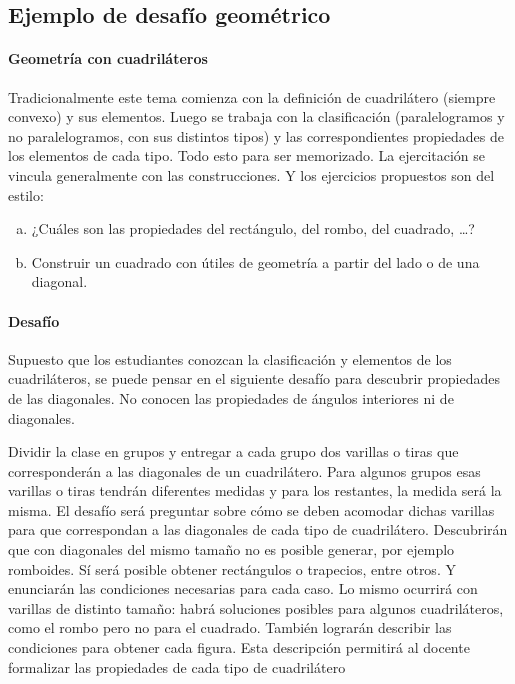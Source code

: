 \documentclass[oneside,spanish]{amsart}
\numberwithin{equation}{section}
\numberwithin{figure}{section}
\theoremstyle{definition}
\begin{document}
\subsection{Ejemplo de desafío geométrico}

\paragraph{\bfseries Geometría con cuadriláteros}

Tradicionalmente este tema comienza con la definición de cuadrilátero (siempre convexo) y sus elementos. Luego se trabaja con la clasificación (paralelogramos y no paralelogramos, con sus distintos tipos) y las correspondientes propiedades de los elementos de cada tipo. Todo esto para ser memorizado. La ejercitación se vincula generalmente con las construcciones. Y los ejercicios propuestos son del estilo:
\begin{enumerate}[a)]
	\item ¿Cuáles son las propiedades del rectángulo, del rombo, del cuadrado, …?
	\item Construir un cuadrado con útiles de geometría a partir del lado o de una diagonal.
\end{enumerate}

\paragraph{\bfseries Desafío}

Supuesto que los estudiantes conozcan la clasificación y elementos de los cuadriláteros, se puede pensar en el siguiente desafío para descubrir propiedades de las diagonales. No conocen las propiedades de ángulos interiores ni de diagonales. 

Dividir la clase en grupos  y entregar a cada grupo dos varillas o tiras que corresponderán a las diagonales de un cuadrilátero. Para algunos grupos esas varillas o tiras tendrán diferentes medidas y para los restantes, la medida será la misma. El desafío será preguntar sobre cómo se deben acomodar dichas varillas para que correspondan a las diagonales de cada tipo de cuadrilátero. Descubrirán que con diagonales del mismo tamaño no es posible generar, por ejemplo romboides. Sí será posible obtener rectángulos o trapecios, entre otros. Y enunciarán las condiciones necesarias para cada caso. Lo mismo ocurrirá con varillas de distinto tamaño: habrá soluciones posibles para algunos cuadriláteros, como el rombo pero no para el cuadrado. También lograrán describir las condiciones para obtener cada figura. Esta descripción permitirá al docente formalizar las propiedades de cada tipo de cuadrilátero
\end{document}
